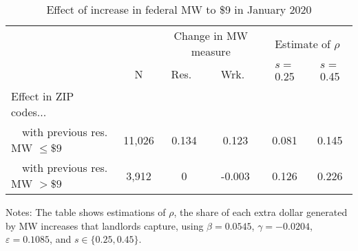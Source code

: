 \begin{table}[h!]
    \centering
    \caption{Effect of increase in federal MW to \$9 in January 2020}
    \label{tab:counterfactuals}

    \begin{tabular}{@{}lccccc@{}}
        \toprule
                            &   & \multicolumn{2}{c}{Change in MW measure}
                                & \multicolumn{2}{c}{Estimate of $\rho$}                  \\ \cmidrule(lr){3-4} \cmidrule(l){5-6}
                            & N & Res.\ & Wrk.\ & $s = $ 0.25  & $s = $ 0.45                 \\ \midrule
        Effect in ZIP codes...                         &      &       &       &     &      \\
        $\quad$with previous res. MW $\leq\$9\quad$    & 11,026 &  0.134  &  0.123  & 0.081 &  0.145 \\
        $\quad$with previous res. MW $>\$9\quad$       & 3,912 &  0  &  -0.003  & 0.126 & 0.226 \\ \bottomrule
    \end{tabular}
    
    \begin{minipage}{.95\textwidth} \footnotesize
        \vspace{2mm}
        Notes: The table shows estimations of $\rho$, the share of each extra dollar generated 
        by MW increases that landlords capture, using $\beta = 0.0545$, $\gamma = -0.0204$, 
        $\varepsilon = 0.1085$, and $s\in\{0.25, 0.45\}$.
    \end{minipage}
\end{table}